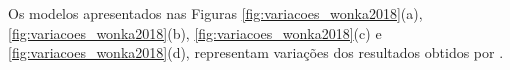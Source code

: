 \newpage

Os modelos apresentados nas Figuras \ref{fig:variacoes_wonka2018}(a), \ref{fig:variacoes_wonka2018}(b), \ref{fig:variacoes_wonka2018}(c) e \ref{fig:variacoes_wonka2018}(d), representam variações dos resultados obtidos por .

\begin{figure}[h!]
	\centering
	\captionsetup{width=15cm}
	{}	
\end{figure}

